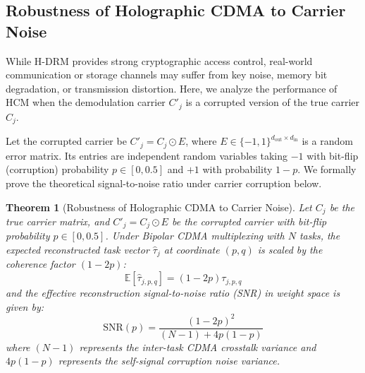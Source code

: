 \documentclass{article}
\newtheorem{theorem}{Theorem}
\begin{document}
\subsection{Robustness of Holographic CDMA to Carrier Noise}
\label{sec:carrier_noise_robustness}

While H-DRM provides strong cryptographic access control, real-world communication or storage channels may suffer from key noise, memory bit degradation, or transmission distortion. Here, we analyze the performance of HCM when the demodulation carrier $C'_j$ is a corrupted version of the true carrier $C_j$.

Let the corrupted carrier be $C'_j = C_j \odot E$, where $E \in \{-1, 1\}^{d_{\text{out}} \times d_{\text{in}}}$ is a random error matrix. Its entries are independent random variables taking $-1$ with bit-flip (corruption) probability $p \in [0, 0.5]$ and $+1$ with probability $1-p$.
We formally prove the theoretical signal-to-noise ratio under carrier corruption below.

\begin{theorem}[Robustness of Holographic CDMA to Carrier Noise]
Let $C_j$ be the true carrier matrix, and $C'_j = C_j \odot E$ be the corrupted carrier with bit-flip probability $p \in [0, 0.5]$.
Under Bipolar CDMA multiplexing with $N$ tasks, the expected reconstructed task vector $\hat{\tau}_{j}$ at coordinate $(p, q)$ is scaled by the coherence factor $(1-2p)$:
\begin{equation}
    \mathbb{E}[\hat{\tau}_{j, p, q}] = (1-2p) \tau_{j, p, q}
\end{equation}
and the effective reconstruction signal-to-noise ratio (SNR) in weight space is given by:
\begin{equation}
    \text{SNR}(p) = \frac{(1-2p)^2}{(N-1) + 4p(1-p)}
\end{equation}
where $(N-1)$ represents the inter-task CDMA crosstalk variance and $4p(1-p)$ represents the self-signal corruption noise variance.
\end{theorem}
\end{document}
